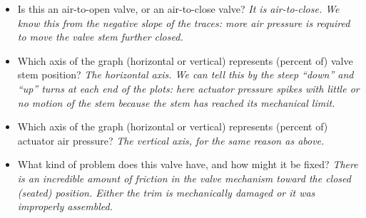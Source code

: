 





\begin{itemize}
\item{} Is this an air-to-open valve, or an air-to-close valve? {\it It is air-to-close.  We know this from the negative slope of the traces: more air pressure is required to move the valve stem further closed.}
\vskip 10pt
\item{} Which axis of the graph (horizontal or vertical) represents (percent of) valve stem position? {\it The horizontal axis.  We can tell this by the steep ``down'' and ``up'' turns at each end of the plots: here actuator pressure spikes with little or no motion of the stem because the stem has reached its mechanical limit.}
\vskip 10pt
\item{} Which axis of the graph (horizontal or vertical) represents (percent of) actuator air pressure? {\it The vertical axis, for the same reason as above.}
\vskip 10pt
\item{} What kind of problem does this valve have, and how might it be fixed? {\it There is an incredible amount of friction in the valve mechanism toward the closed (seated) position.  Either the trim is mechanically damaged or it was improperly assembled.}
\end{itemize}




